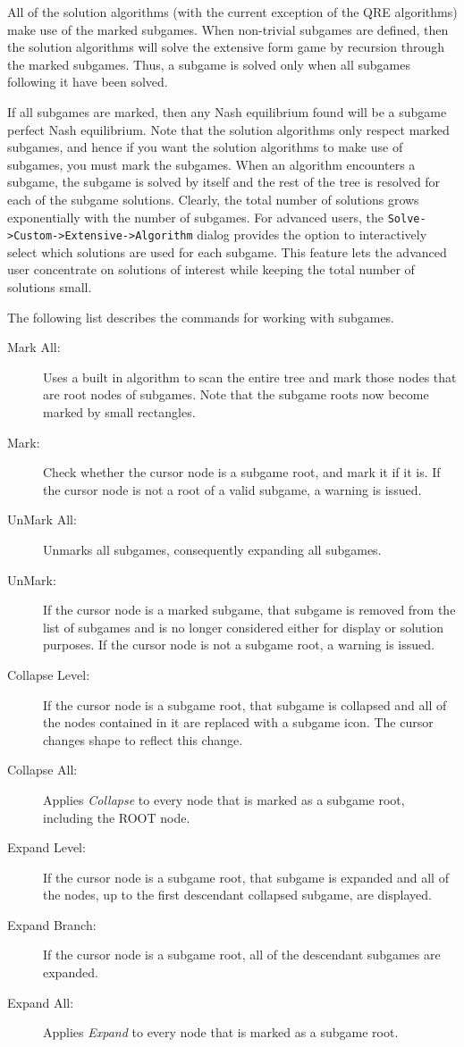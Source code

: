 {All of the solution algorithms (with the current exception of the 
QRE algorithms) make use of the marked subgames.  When non-trivial 
subgames are defined, then the solution algorithms will solve the 
extensive form game by recursion through the marked subgames.  Thus, a 
subgame is solved only when all subgames following it have been 
solved.  

If all subgames are marked, then any Nash equilibrium found will be a 
subgame perfect Nash equilibrium.  
Note that the solution algorithms only 
respect marked subgames, and hence if you want the solution 
algorithms to make use of subgames, you must mark the subgames.  
When an algorithm encounters a subgame, the subgame is solved by itself and
the rest of the tree is resolved for each of the subgame solutions.  Clearly,
the total number of solutions grows exponentially with the number of subgames.
For advanced users, the {\tt Solve->Custom->Extensive->Algorithm} dialog provides 
the option to interactively select
which solutions are used for each subgame.  This feature lets the advanced user
concentrate on solutions of interest while keeping the total number of solutions
small.  

The following list describes the commands for working with subgames. 
\begin{description}
\item[Mark All:] Uses a built in algorithm to scan the entire tree and mark
those nodes that are root nodes of subgames.  Note that the subgame roots
now become marked by small rectangles.
\item[Mark:] Check whether the cursor node is a subgame root, and mark 
it if it is.  If the cursor node is 
not a root of a valid subgame, a warning is issued. 
\item[UnMark All:] Unmarks all subgames, consequently expanding all
subgames.
\item[UnMark:] If the cursor node is a marked subgame, that subgame is removed
from the list of subgames and is no longer considered either for display or
solution purposes.  If the cursor node is not a subgame root, a warning is
issued.
\item[Collapse Level:] If the cursor node is a subgame root, that subgame is 
collapsed and all of the nodes contained in it are replaced with a subgame 
icon.  The cursor changes shape to reflect this change.
\item[Collapse All:] Applies {\em Collapse} to every node that is marked as a 
subgame root, including the ROOT node.
\item[Expand Level:] If the cursor node is a subgame root, that subgame is expanded
and all of the nodes, up to the first descendant collapsed subgame,
are displayed.
\item[Expand Branch:] If the cursor node is a subgame root, all of the
descendant subgames are expanded.
\item[Expand All:] Applies {\em Expand} to every node that is marked as a 
subgame root.
\end{description}


}
